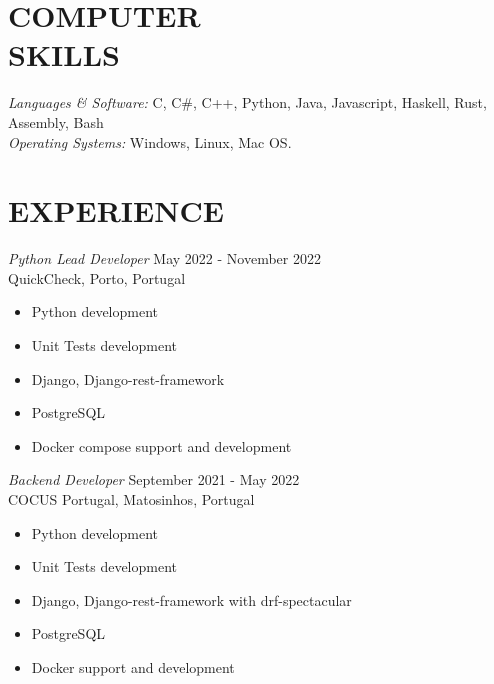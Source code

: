 \documentclass[margin, 10pt]{res} %
\begin{document}
\begin{resume}

    \section{COMPUTER \\ SKILLS}

     {\sl Languages \& Software:}
    C, C\#, C++, Python, Java, Javascript, Haskell, Rust, Assembly, Bash\\
    {\sl Operating Systems:} Windows, Linux, Mac OS.


    \section{EXPERIENCE}

     {\sl Python Lead Developer} \hfill May 2022 - November 2022\\
    QuickCheck, Porto, Portugal

    \begin{itemize} \itemsep -2pt %
        \item Python development
        \item Unit Tests development
        \item Django, Django-rest-framework
        \item PostgreSQL
        \item Docker compose support and development
    \end{itemize}


    {\sl Backend Developer} \hfill September 2021 - May 2022\\
    COCUS Portugal, Matosinhos, Portugal

    \begin{itemize} \itemsep -2pt %
        \item Python development
        \item Unit Tests development
        \item Django, Django-rest-framework with drf-spectacular
        \item PostgreSQL
        \item Docker support and development
    \end{itemize}



\end{resume}
\end{document}
